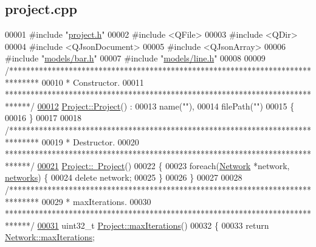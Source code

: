 \hypertarget{project_8cpp_source}{}\subsection{project.\+cpp}
\label{project_8cpp_source}

\begin{DoxyCode}
00001 \textcolor{preprocessor}{#include "\hyperlink{project_8h}{project.h}"}
00002 \textcolor{preprocessor}{#include <QFile>}
00003 \textcolor{preprocessor}{#include <QDir>}
00004 \textcolor{preprocessor}{#include <QJsonDocument>}
00005 \textcolor{preprocessor}{#include <QJsonArray>}
00006 \textcolor{preprocessor}{#include "\hyperlink{bar_8h}{models/bar.h}"}
00007 \textcolor{preprocessor}{#include "\hyperlink{line_8h}{models/line.h}"}
00008 
00009 \textcolor{comment}{/*******************************************************************************}
00010 \textcolor{comment}{ * Constructor.}
00011 \textcolor{comment}{ ******************************************************************************/}
\hypertarget{project_8cpp_source_l00012}{}\hyperlink{class_project_aa007ecd17d5bc800e7a956cf666eea21}{00012} \hyperlink{class_project_aa007ecd17d5bc800e7a956cf666eea21}{Project::Project}() :
00013   name(\textcolor{stringliteral}{""}),
00014   filePath(\textcolor{stringliteral}{""})
00015 \{
00016 \}
00017 
00018 \textcolor{comment}{/*******************************************************************************}
00019 \textcolor{comment}{ * Destructor.}
00020 \textcolor{comment}{ ******************************************************************************/}
\hypertarget{project_8cpp_source_l00021}{}\hyperlink{class_project_ad165d61b76ee86ee9c27fd987a2a7b9e}{00021} \hyperlink{class_project_ad165d61b76ee86ee9c27fd987a2a7b9e}{Project::~Project}()
00022 \{
00023   \textcolor{keywordflow}{foreach}(\hyperlink{class_network}{Network} *network, \hyperlink{class_project_aa98126154cab59769a431668e6f17daf}{networks}) \{
00024     \textcolor{keyword}{delete} network;
00025   \}
00026 \}
00027 
00028 \textcolor{comment}{/*******************************************************************************}
00029 \textcolor{comment}{ * maxIterations.}
00030 \textcolor{comment}{ ******************************************************************************/}
\hypertarget{project_8cpp_source_l00031}{}\hyperlink{class_project_ab9d6426396a75f2fcaeadcddcd0fac64}{00031} uint32\_t \hyperlink{class_project_ab9d6426396a75f2fcaeadcddcd0fac64}{Project::maxIterations}()
00032 \{
00033   \textcolor{keywordflow}{return} \hyperlink{group___graphics_ga318dee060bc577eacd67d332efbbe1b2}{Network::maxIterations};

\end{DoxyCode}
